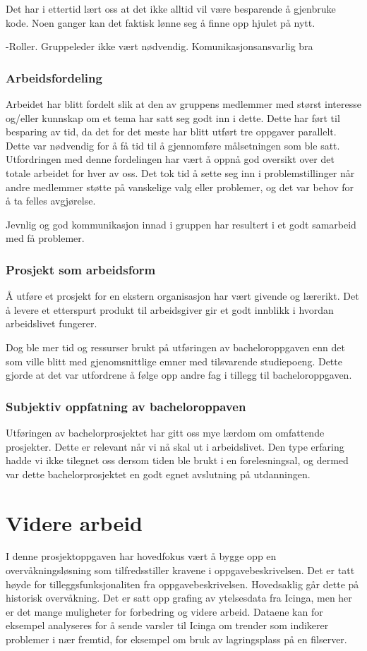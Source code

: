 Det har i ettertid lært oss at det ikke alltid vil være besparende å gjenbruke kode. Noen ganger kan det faktisk lønne seg å finne opp hjulet på nytt.

-Roller. Gruppeleder ikke vært nødvendig. Komunikasjonsansvarlig bra
\subsubsection{Arbeidsfordeling}
Arbeidet har blitt fordelt slik at den av gruppens medlemmer med størst interesse og/eller kunnskap om et tema har satt seg godt inn i dette. Dette har ført til besparing av tid, da det for det meste har blitt utført tre oppgaver parallelt. Dette var nødvendig for å få tid til å gjennomføre målsetningen som ble satt. Utfordringen med denne fordelingen har vært å oppnå god oversikt over det totale arbeidet for hver av oss. Det tok tid å sette seg inn i problemstillinger når andre medlemmer støtte på vanskelige valg eller problemer, og det var behov for å ta felles avgjørelse.

Jevnlig og god kommunikasjon innad i gruppen har resultert i et godt samarbeid med få problemer. 

\subsubsection{Prosjekt som arbeidsform}
Å utføre et prosjekt for en ekstern organisasjon har vært givende og lærerikt. Det å levere et etterspurt produkt til arbeidsgiver gir et godt innblikk i hvordan arbeidslivet fungerer.

Dog ble mer tid og ressurser brukt på utføringen av bacheloroppgaven enn det som ville blitt med gjenomsnittlige emner med tilsvarende studiepoeng. Dette gjorde at det var utfordrene å følge opp andre fag i tillegg til bacheloroppgaven.

\subsubsection{Subjektiv oppfatning av bacheloroppaven}
Utføringen av bachelorprosjektet har gitt oss mye lærdom om omfattende prosjekter. Dette er relevant når vi nå skal ut i arbeidslivet. Den type erfaring hadde vi ikke tilegnet oss dersom tiden ble brukt i en forelesningsal, og dermed var dette bachelorprosjektet en godt egnet avslutning på utdanningen. 

\section{Videre arbeid}
I denne prosjektoppgaven har hovedfokus vært å bygge opp en overvåkningsløsning som tilfredsstiller kravene i oppgavebeskrivelsen. Det er tatt høyde for tilleggsfunksjonaliten fra oppgavebeskrivelsen. Hovedsaklig går dette på historisk overvåkning. Det er satt opp grafing av ytelsesdata fra Icinga, men her er det mange muligheter for forbedring og videre arbeid. Dataene kan for eksempel analyseres for å sende varsler til Icinga om trender som indikerer problemer i nær fremtid, for eksempel om bruk av lagringsplass på en filserver.

